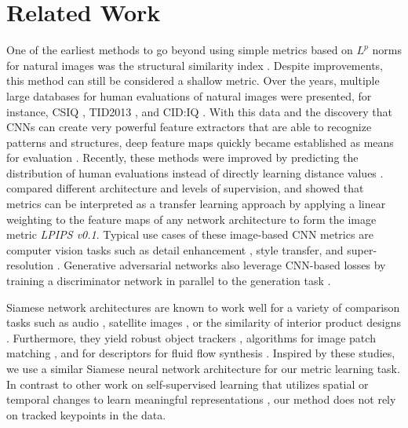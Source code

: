 \documentclass{article}
\begin{document}
\section{Related Work} \label{sec: related work}
One of the earliest methods to go beyond using simple metrics based on $L^p$ norms for natural images was the structural similarity index \citep{wang2004}. Despite improvements, this method can still be considered a shallow metric.
Over the years, multiple large databases for human evaluations of natural images were presented, for instance, CSIQ \citep{larson2010}, TID2013 \citep{ponomarenko2015}, and CID:IQ \citep{liu2014}. With this data and the discovery that CNNs can create very powerful feature extractors that are able to recognize patterns and structures, deep feature maps quickly became established as means for evaluation
\citep{amirshahi2016, berardino2017, bosse2016, kang2014, kim2017}. Recently, these methods were improved by predicting the distribution of human evaluations instead of directly learning distance values \citep{prashnani2018, talebi2018b}. \citeauthor{zhang2018} compared different architecture and levels of supervision, and showed that metrics can be interpreted as a transfer learning approach by applying a linear weighting to the feature maps of any network architecture to form the image metric \textit{LPIPS v0.1}. Typical use cases of these image-based CNN metrics are computer vision tasks such as detail enhancement \citep{talebi2018a}, style transfer, and super-resolution \citep{johnson2016}.
Generative adversarial networks also leverage CNN-based losses by training a discriminator network in parallel to the generation task \citep{dosovitskiy2016}.
\vspace{-0.02cm}

Siamese network architectures are known to work well for a variety of comparison tasks such as audio \citep{zhang2017}, satellite images \citep{he2019}, or the similarity of interior product designs \citep{bell2015}. Furthermore, they yield robust object trackers \citep{bertinetto2016}, algorithms for image patch matching \citep{hanif2019}, and for descriptors for fluid flow synthesis \citep{chu2017}.
Inspired by these studies, we use a similar Siamese neural network architecture for our metric learning task.
In contrast to other work on self-supervised learning that utilizes spatial or temporal changes to learn meaningful representations \citep{agrawal2015, wang2015}, our method does not rely on tracked keypoints in the data.
\vspace{-0.02cm}
\end{document}
